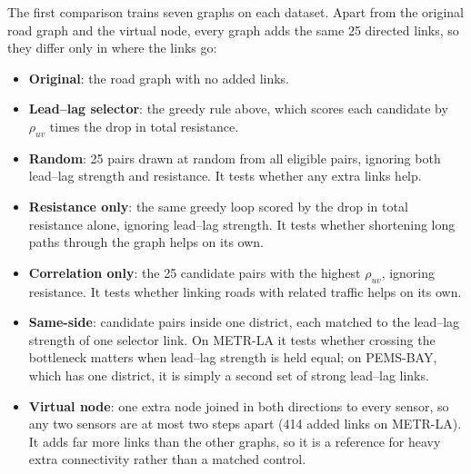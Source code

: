 \documentclass[journal]{IEEEtran}
\begin{document}
The first comparison trains seven graphs on each dataset. Apart from the original road graph and the virtual node, every graph adds the same 25 directed links, so they differ only in where the links go:
\begin{itemize}
\item \textbf{Original}: the road graph with no added links.
\item \textbf{Lead--lag selector}: the greedy rule above, which scores each candidate by $\rho_{uv}$ times the drop in total resistance.
\item \textbf{Random}: 25 pairs drawn at random from all eligible pairs, ignoring both lead--lag strength and resistance. It tests whether any extra links help.
\item \textbf{Resistance only}: the same greedy loop scored by the drop in total resistance alone, ignoring lead--lag strength. It tests whether shortening long paths through the graph helps on its own.
\item \textbf{Correlation only}: the 25 candidate pairs with the highest $\rho_{uv}$, ignoring resistance. It tests whether linking roads with related traffic helps on its own.
\item \textbf{Same-side}: candidate pairs inside one district, each matched to the lead--lag strength of one selector link. On METR-LA it tests whether crossing the bottleneck matters when lead--lag strength is held equal; on PEMS-BAY, which has one district, it is simply a second set of strong lead--lag links.
\item \textbf{Virtual node}: one extra node joined in both directions to every sensor, so any two sensors are at most two steps apart (414 added links on METR-LA). It adds far more links than the other graphs, so it is a reference for heavy extra connectivity rather than a matched control.
\end{itemize}
\end{document}
